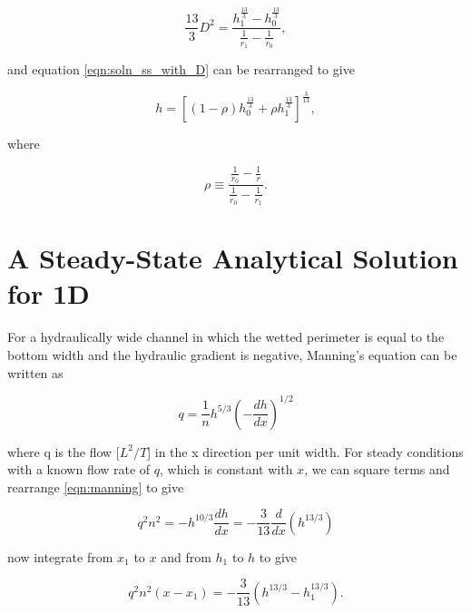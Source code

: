 \documentclass[fleqn]{article}
\begin{document}
\begin{equation}
  \frac{13}{3} D^{2} = \frac{h^{\frac{13}{3}}_{1} - h^{\frac{13}{3}}_{0}}{\frac{1}{r_{1}} - \frac{1}{r_{0}}},
  \label{eqn:D_evaluated}
\end{equation}

\noindent and equation \ref{eqn:soln_ss_with_D} can be rearranged to give

\begin{equation}
  h = \left [ \left (1 - \rho \right ) h^{\frac{13}{3}}_{0} + \rho h^{\frac{13}{3}}_{1} \right ]^{\frac{3}{13}} ,
  \label{eqn:soln_ss}
\end{equation}

\noindent where 

\begin{equation}
  \rho \equiv \frac{\frac{1}{r_{0}} - \frac{1}{r}}{\frac{1}{r_{0}} - \frac{1}{r_{1}}} .
  \label{eqn:rho_defined}
\end{equation}

\section{A Steady-State Analytical Solution for 1D}

For a hydraulically wide channel in which the wetted perimeter is equal to the bottom width and the hydraulic gradient is negative, Manning's equation can be written as

\begin{equation}
  q = \frac{1}{n} h^{5/3} \left ( - \frac{dh}{dx} \right )^ {1/2}
  \label{eqn:manning}
\end{equation}

\noindent where q is the flow [$L^2/T$] in the x direction per unit width.  For steady conditions with a known flow rate of $q$, which is constant with $x$, we can square terms and rearrange \ref{eqn:manning} to give 

\begin{equation}
  q^2 n^2 = - h^{10/3} \frac{dh}{dx} = -\frac{3}{13} \frac{d}{dx} \left ( h^{13/3} \right )
  \label{eqn:manning2}
\end{equation}

\noindent now integrate from $x_1$ to $x$ and from $h_1$ to $h$ to give

\begin{equation}
  q^2 n^2 (x - x_1) = -\frac{3}{13} \left ( h^{13/3} - h_1^{13/3} \right ).
  \label{eqn:manning3}
\end{equation}
\end{document}
